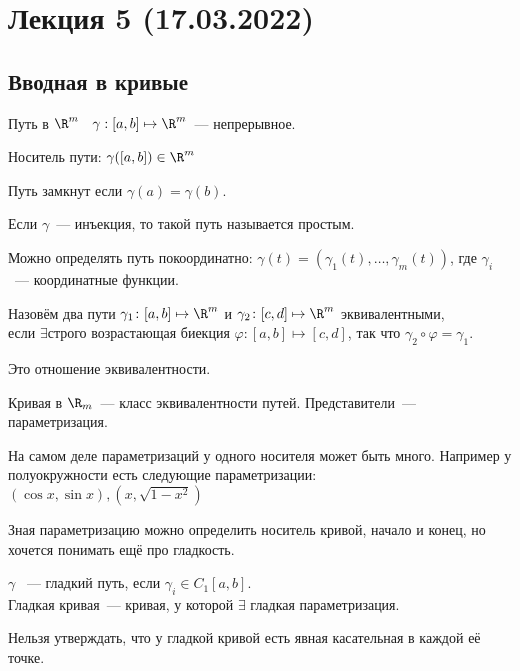 \section*{Лекция 5 (17.03.2022)}
\subsection{Вводная в кривые}
\begin{definition}
    Путь в $\R^m$ \, $\gamma : [a, b] \mapsto \R^m$~--- непрерывное.
\end{definition}
\begin{definition}
    Носитель пути: $\gamma([a, b])\in \R^m$
\end{definition}
\begin{definition}
    Путь замкнут если $\gamma(a) = \gamma(b)$.
\end{definition}
\begin{definition}
    Если $\gamma$~--- инъекция, то такой путь называется
    простым.
\end{definition}
\begin{remark}
    Можно определять путь покоординатно:
    $\gamma(t) = (\gamma_1(t),\dots, \gamma_m(t))$, где $\gamma_i$~--- координатные функции.
\end{remark}
\begin{definition}
    Назовём два пути $\gamma_1\colon [a,b]\mapsto \R^m$ и
    $\gamma_2\colon [c,d]\mapsto \R^m$ эквивалентными,\\
    если $\exists \text{строго возрастающая биекция }
    \varphi\colon [a,b]\mapsto[c, d]$, так что 
    $\gamma_2\circ \varphi = \gamma_1$.
\end{definition}
\begin{remark}
    Это отношение эквивалентности.
\end{remark}
\begin{definition}
    Кривая в $\R_m$~--- класс эквивалентности путей.
    Представители~--- параметризация.
\end{definition}
\begin{remark}
    На самом деле параметризаций у одного носителя может быть
    много. Например у полуокружности есть следующие параметризации:
    $(\cos x, \sin x), (x, \sqrt{1 - x^2})$
\end{remark}
\begin{remark}
    Зная параметризацию можно определить носитель кривой,
    начало и конец, но хочется понимать ещё про гладкость.
\end{remark}
\begin{definition}
    $\gamma$ ~--- гладкий путь, если $\gamma_i\in C_1[a,b]$.\\
    Гладкая кривая~--- кривая, у которой $\exists$ гладкая
    параметризация.
\end{definition}
\begin{remark}
    Нельзя утверждать, что у гладкой кривой есть явная касательная
    в каждой её точке.
\end{remark}

